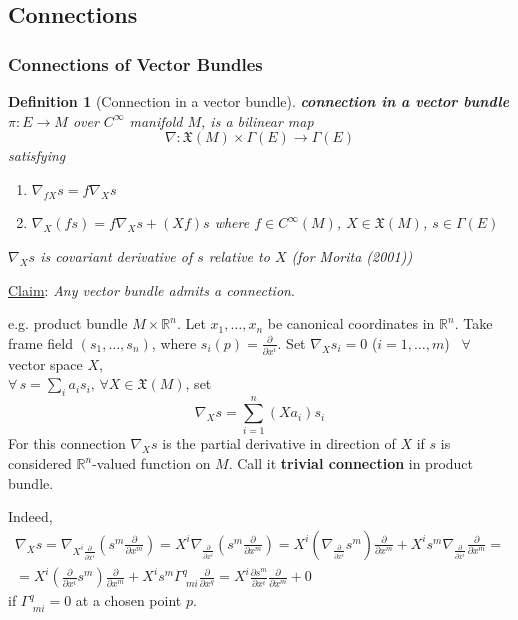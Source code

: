\documentclass[10pt]{amsart}
\newtheorem{definition}{Definition}
\begin{document}
\begin{multicols*}{2}
\part{Connections}

\section{Connections of Vector Bundles}

\cite{Mori2001}

\begin{definition}[Connection in a vector bundle]
	\textbf{connection in a vector bundle} $\pi : E \to M$ over $C^{\infty}$ manifold $M$, is a bilinear map
	\[
	\nabla : \mathfrak{X}(M) \times \Gamma(E) \to \Gamma(E)
	\]
	satisfying
	\begin{enumerate}
		\item[(i)] $\nabla_{fX} s = f\nabla_X s$
		\item[(ii)] $\nabla_X(fs) = f\nabla_Xs + (Xf)s$ where $f\in C^{\infty}(M)$, $X \in \mathfrak{X}(M)$, $s\in \Gamma(E)$
	\end{enumerate}
$\nabla_Xs$ is covariant derivative of $s$ relative to $X$ (for Morita (2001)\cite{Mori2001})
\end{definition} 

\underline{Claim}: \emph{Any vector bundle admits a connection}.

e.g. product bundle $M\times \mathbb{R}^n$. Let $x_1, \dots , x_n$ be canonical coordinates in $\mathbb{R}^n$. Take frame field $(s_1, \dots, s_n)$, where $s_i(p) = \frac{\partial}{\partial x^i}$. Set $\nabla_X s_i =0 $ ($i=1,\dots , m$) \quad \, $\forall \, $ vector space $X$, \\
$\forall \, s = \sum_i a_i s_i, \, \forall X \in \mathfrak{X}(M)$, set 
\[
\nabla_X s = \sum_{i=1}^n (Xa_i) s_i
\]
For this connection $\nabla_Xs$ is the partial derivative in direction of $X$ if $s$ is considered $\mathbb{R}^n$-valued function on $M$. Call it \textbf{trivial connection} in product bundle.

Indeed,
\[
\begin{gathered}
	\nabla_X s = \nabla_{ X^i \frac{\partial}{\partial x^i}} \left( s^m \frac{\partial}{\partial x^m} \right) = X^i \nabla_{ \frac{\partial}{\partial x^i} } \left( s^m \frac{\partial}{\partial x^m} \right) = X^i \left( \nabla_{ \frac{\partial}{\partial x^i} } s^m \right) \frac{\partial}{\partial x^m} + X^i s^m \nabla_{ \frac{\partial}{\partial x^i} } \frac{\partial}{\partial x^m} = \\	
		= X^i \left( \frac{\partial}{\partial x^i} s^m \right) \frac{\partial}{\partial x^m} + X^i s^m \Gamma^q_{ \, \, mi} \frac{\partial}{\partial x^q} = X^i \frac{ \partial s^m}{ \partial x^i} \frac{\partial }{ \partial x^m } + 0 
\end{gathered}
\]
if $\Gamma^q_{ \, \, mi} =0$ at a chosen point $p$.


\end{multicols*}
\end{document}
